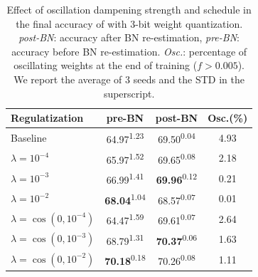 \begin{table}[t]
    \centering
    \begin{tabular}{ l | c  c  c }
    \toprule
  Regulatization & pre-BN &  post-BN & Osc.(\%) \\
        \midrule
Baseline  & 64.97\textsuperscript{1.23} & 69.50\textsuperscript{0.04} & 4.93\\
\midrule
$\lambda=10^{-4}$   & 65.97\textsuperscript{1.52}       &  69.65\textsuperscript{0.08} &  2.18 \\
$\lambda=10^{-3}$   & {66.99}\textsuperscript{1.41}     & \textbf{69.96}\textsuperscript{0.12} & 0.21 \\
$\lambda=10^{-2}$	& \textbf{68.04}\textsuperscript{1.04}  & 68.57\textsuperscript{0.07} & 0.01 \\
\midrule
$\lambda=\cos(0, 10^{-4})$  & 64.47\textsuperscript{1.59} & 69.61\textsuperscript{0.07} & 2.64 \\ 
$\lambda=\cos(0, 10^{-3})$  & {68.79}\textsuperscript{1.31} & \textbf{70.37}\textsuperscript{0.06} & 1.63 \\ 
$\lambda=\cos(0, 10^{-2})$  & \textbf{70.18}\textsuperscript{0.18} & 70.26\textsuperscript{0.08} & 1.11 \\ 
\bottomrule
\end{tabular}
 \caption{Effect of oscillation dampening strength and schedule in the final accuracy of  with 3-bit weight quantization. \textit{post-BN}: accuracy after BN re-estimation, \textit{pre-BN}: accuracy before BN re-estimation. \textit{Osc.}: percentage of oscillating weights at the end of training ($f>0.005$). We report the average of 3 seeds and the STD in the superscript.}
 \label{tbl:ocillation_dampening_ablation}
\end{table}
